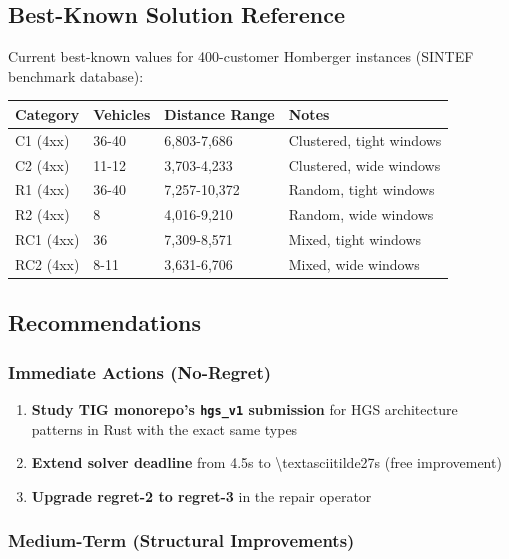 \documentclass[twocolumn,10pt,letterpaper]{article}
\begin{document}
\subsection{Best-Known Solution Reference}

Current best-known values for 400-customer Homberger instances (SINTEF benchmark database):


\vspace{0.4em}
\noindent
\small
\begin{tabularx}{\columnwidth}{@{}XXXX@{}}
\toprule
\textbf{Category} & \textbf{Vehicles} & \textbf{Distance Range} & \textbf{Notes} \\
\midrule
C1 (4xx) & 36-40 & 6,803-7,686 & Clustered, tight windows \\
C2 (4xx) & 11-12 & 3,703-4,233 & Clustered, wide windows \\
R1 (4xx) & 36-40 & 7,257-10,372 & Random, tight windows \\
R2 (4xx) & 8 & 4,016-9,210 & Random, wide windows \\
RC1 (4xx) & 36 & 7,309-8,571 & Mixed, tight windows \\
RC2 (4xx) & 8-11 & 3,631-6,706 & Mixed, wide windows \\
\bottomrule
\end{tabularx}
\vspace{0.4em}

\subsection{Recommendations}

\subsubsection{Immediate Actions (No-Regret)}

\begin{enumerate}
\setlength{\itemsep}{0pt}
\setlength{\parskip}{0pt}
  \item \textbf{Study TIG monorepo's \texttt{hgs\_v1} submission} for HGS architecture patterns in Rust with the exact same types
  \item \textbf{Extend solver deadline} from 4.5s to \textbackslash{}textasciitilde27s (free improvement)
  \item \textbf{Upgrade regret-2 to regret-3} in the repair operator
\end{enumerate}

\subsubsection{Medium-Term (Structural Improvements)}
\end{document}
